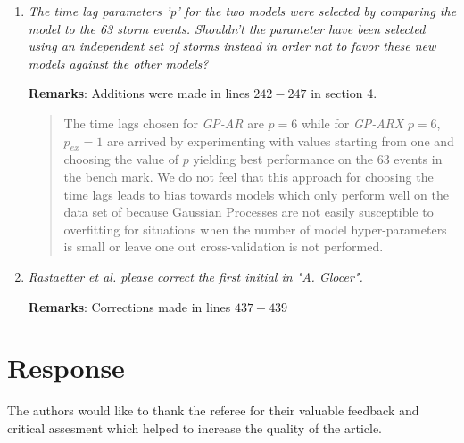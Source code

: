 \documentclass{article}
\begin{document}
\begin{enumerate}
\item \emph{The time lag parameters 'p' for the two models were selected by comparing the model to the 63 storm events. Shouldn't the parameter have been selected using an independent set of storms instead in order not to favor these new models against the other models?}

\textbf{Remarks}: Additions were made in lines $242-247$ in section 4. \blockquote{The time lags chosen for \emph{GP-AR} are $p = 6$ while for \emph{GP-ARX} $p=6$, $p_{ex} = 1$ are arrived by experimenting with values starting from one and choosing the value of $p$ yielding best performance on the 63 events in the bench mark. We do not feel that this approach for choosing the time lags leads to bias towards models which only perform well on the data set of \cite{Ji2012} because Gaussian Processes are not easily susceptible to overfitting for situations when the number of model hyper-parameters is small or leave one out cross-validation is not performed.}

\item \emph{Rastaetter et al. please correct the first initial in "A. Glocer".} 

\textbf{Remarks}: Corrections made in lines $437-439$

\end{enumerate}

\section{Response}

The authors would like to thank the referee for their valuable feedback and critical assesment which helped to increase the quality of the article. 


\end{document}
